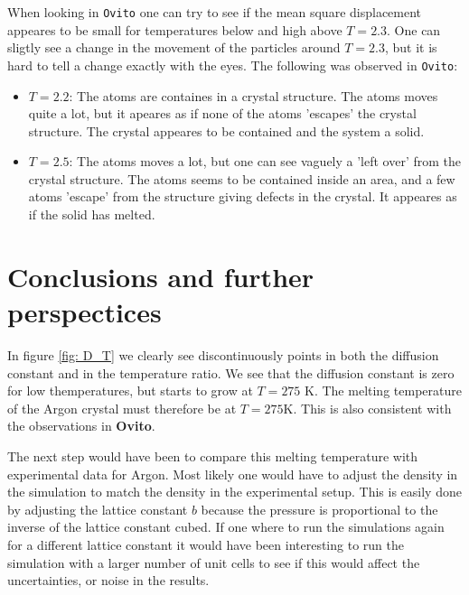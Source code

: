 \documentclass[11pt,a4wide]{article}
\begin{document}
When looking in \texttt{Ovito} one can try to see if the mean square displacement appeares to be small for temperatures below and high above $T=2.3$. One can sligtly see a change in the movement of the particles around $T=2.3$, but it is hard to tell a change exactly with the eyes. The following was observed in \texttt{Ovito}:
\begin{itemize}
\item $T=2.2$: The atoms are containes in a crystal structure. The atoms moves quite a lot, but it apeares as if none of the atoms 'escapes' the crystal structure. The crystal appeares to be contained and the system a solid. 
\item $T=2.5$: The atoms moves a lot, but one can see vaguely a 'left over' from the crystal structure. The atoms seems to be contained inside an area, and a few atoms 'escape' from the structure giving defects in the crystal. It appeares as if the solid has melted. 
\end{itemize}

\newpage
\section{Conclusions and further perspectices}
In figure \ref{fig: D_T} we clearly see discontinuously points in both the diffusion constant and in the temperature ratio. We see that the diffusion constant is zero for low themperatures, but starts to grow at $T = 275$ K. The melting temperature of the Argon crystal must therefore be at $T = 275$K. This is also consistent with the observations in \textbf{Ovito}. 

The next step would have been to compare this melting temperature with experimental data for Argon. Most likely one would have to adjust the density in the simulation to match the density in the experimental setup. This is easily done by adjusting the lattice constant $b$ because the pressure is proportional to the inverse of the lattice constant cubed. If one where to run the simulations again for a different lattice constant it would have been interesting to run the simulation with a larger number of unit cells to see if this would affect the uncertainties, or noise in the results. 
\end{document}
